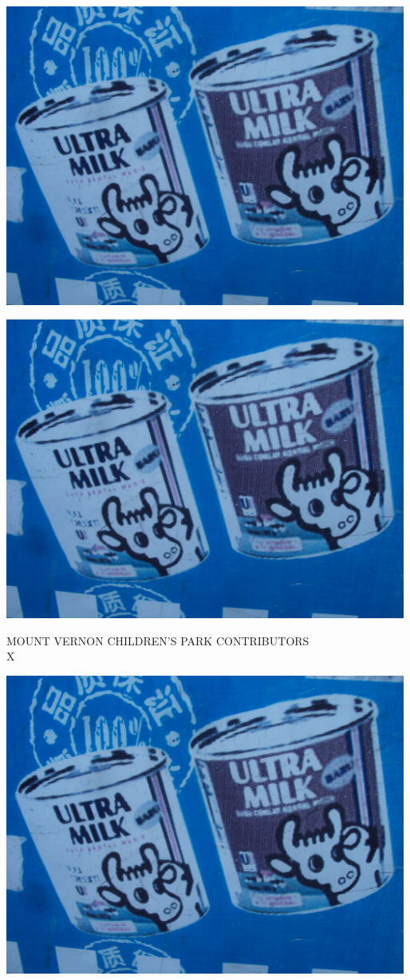 \documentclass[10pt,letterpaper]{article}
\begin{document}
\includegraphics[width=5.19in]{landscape.jpg}

\vspace{0.25in}
\includegraphics[width=5.19in]{landscape.jpg}

MOUNT VERNON CHILDREN'S PARK CONTRIBUTORS\\
X\\
\pagebreak

\includegraphics[width=5.19in]{landscape.jpg}
\end{document}
